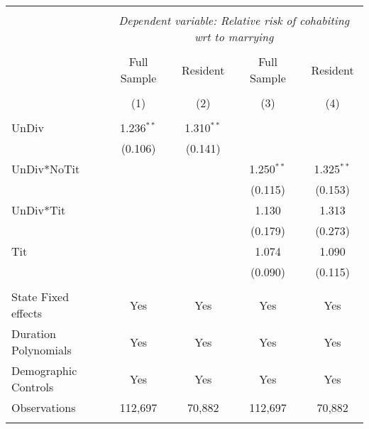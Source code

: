 
\begingroup 
\footnotesize 
\begin{tabular}{@{\extracolsep{5pt}}lcccc} 
\\[-1.8ex]\hline 
\hline \\[-1.8ex] 
 & \multicolumn{4}{c}{\textit{Dependent variable: Relative risk of cohabiting wrt to marrying}} \\
\cline{2-5} \\[-1.5ex]
 & Full Sample & Resident & Full Sample & Resident \\[-1ex]
\\[-1.4ex] & (1) & (2) & (3) & (4)\\ 
\hline \\[-1.8ex] 
 UnDiv    & 1.236$^{**}$ & 1.310$^{**}$ &   & \\ 
   & (0.106) & (0.141) &   &\\ 

 UnDiv*NoTit &   &   & 1.250$^{**}$ & 1.325$^{**}$ \\ 
  &   &  & (0.115) & (0.153) \\ 
  UnDiv*Tit &   &   & 1.130 & 1.313 \\ 
  &   &   & (0.179) & (0.273) \\ 
  Tit &   &   & 1.074 & 1.090 \\ 
  &  &  & (0.090) & (0.115) \\ 
 \hline \\[-1.8ex] 
State Fixed effects & Yes & Yes & Yes & Yes \\ 
Duration Polynomials & Yes & Yes & Yes & Yes \\ 
Demographic Controls & Yes & Yes & Yes & Yes \\ 
Observations & 112,697 & 70,882 & 112,697 & 70,882 \\ 
\hline 
\hline \\[-1.8ex] 
\end{tabular} 
\endgroup 
